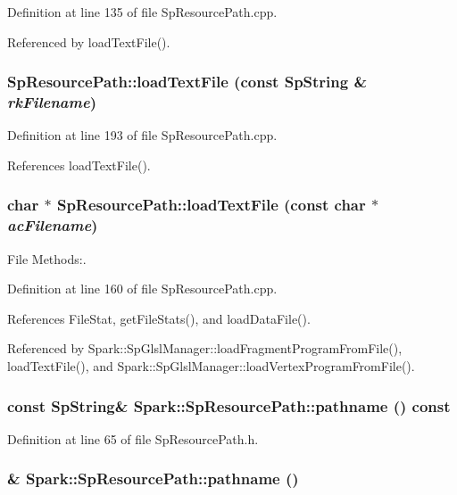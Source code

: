 Definition at line 135 of file Sp\-Resource\-Path.cpp.

Referenced by load\-Text\-File().
\subsubsection{ Sp\-Resource\-Path::load\-Text\-File (const {\bf Sp\-String} \& {\em rk\-Filename})}\label{classSpark_1_1SpResourcePath_a10}


Definition at line 193 of file Sp\-Resource\-Path.cpp.

References load\-Text\-File().
\subsubsection{\setlength{\rightskip}{0pt plus 5cm}char $\ast$ Sp\-Resource\-Path::load\-Text\-File (const char $\ast$ {\em ac\-Filename})}\label{classSpark_1_1SpResourcePath_a9}


File Methods:. 

Definition at line 160 of file Sp\-Resource\-Path.cpp.

References File\-Stat, get\-File\-Stats(), and load\-Data\-File().

Referenced by Spark::Sp\-Glsl\-Manager::load\-Fragment\-Program\-From\-File(), load\-Text\-File(), and Spark::Sp\-Glsl\-Manager::load\-Vertex\-Program\-From\-File().
\subsubsection{\setlength{\rightskip}{0pt plus 5cm}const {\bf Sp\-String}\& Spark::Sp\-Resource\-Path::pathname () const\hspace{0.3cm}{\tt  [inline]}}\label{classSpark_1_1SpResourcePath_a3}


Definition at line 65 of file Sp\-Resource\-Path.h.
\subsubsection{\& Spark::Sp\-Resource\-Path::pathname ()\hspace{0.3cm}{\tt  [inline]}}\label{classSpark_1_1SpResourcePath_a2}


